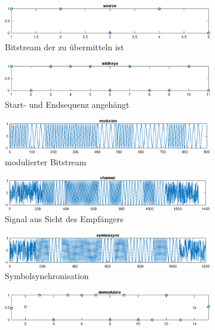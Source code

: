 \documentclass[11pt]{article}
\begin{document}
\pagebreak
\begin{figure}
\centering
\begin{subfigure}{\textwidth}
\includegraphics[width=\textwidth]{source.eps}
\caption{Bitstream der zu \"ubermitteln ist}
\end{subfigure}
\begin{subfigure}{\textwidth}
\includegraphics[width=\textwidth]{addkeys.eps}
\caption{Start- und Endsequenz angeh\"angt}
\end{subfigure}
\begin{subfigure}{\textwidth}
\includegraphics[width=\textwidth]{modulate.eps}
\caption{modulierter Bitstream}
\end{subfigure}
\begin{subfigure}{\textwidth}
\includegraphics[width=\textwidth]{noisy.eps}
\caption{Signal aus Sicht des Empf\"angers}
\end{subfigure}
\begin{subfigure}{\textwidth}
\includegraphics[width=\textwidth]{symbsync.eps}
\caption{Symbolsynchronisation}
\end{subfigure}
\begin{subfigure}{\textwidth}
\includegraphics[width=\textwidth]{demodulate.eps}

\end{subfigure}
\end{figure}
\end{document}
